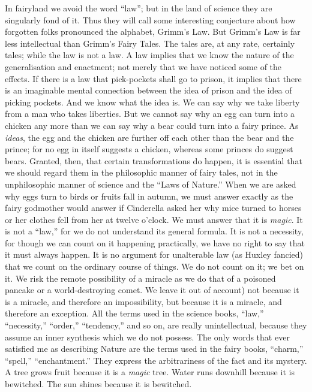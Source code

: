 \documentclass{book}
\begin{document}
In fairyland we avoid the word “law”; but in the land of science they are singularly fond of it. Thus they will call some interesting conjecture about how forgotten folks pronounced the alphabet, Grimm’s Law. But Grimm’s Law is far less intellectual than Grimm’s Fairy Tales. The tales are, at any rate, certainly tales; while the law is not a law. A law implies that we know the nature of the generalisation and enactment; not merely that we have noticed some of the effects. If there is a law that pick-pockets shall go to prison, it implies that there is an imaginable mental connection between the idea of prison and the idea of picking pockets. And we know what the idea is. We can say why we take liberty from a man who takes liberties. But we cannot say why an egg can turn into a chicken any more than we can say why a bear could turn into a fairy prince. As \emph{ideas}, the egg and the chicken are further off each other than the bear and the prince; for no egg in itself suggests a chicken, whereas some princes do suggest bears. Granted, then, that certain transformations do happen, it is essential that we should regard them in the philosophic manner of fairy tales, not in the unphilosophic manner of science and the “Laws of Nature.” When we are asked why eggs turn to birds or fruits fall in autumn, we must answer exactly as the fairy godmother would answer if Cinderella asked her why mice turned to horses or her clothes fell from her at twelve o’clock. We must answer that it is \emph{magic}. It is not a “law,” for we do not understand its general formula. It is not a necessity, for though we can count on it happening practically, we have no right to say that it must always happen. It is no argument for unalterable law (as Huxley fancied) that we count on the ordinary course of things. We do not count on it; we bet on it. We risk the remote possibility of a miracle as we do that of a poisoned pancake or a world-destroying comet. We leave it out of account) not because it is a miracle, and therefore an impossibility, but because it is a miracle, and therefore an exception. All the terms used in the science books, “law,” “necessity,” “order,” “tendency,” and so on, are really unintellectual, because they assume an inner synthesis which we do not possess. The only words that ever satisfied me as describing Nature are the terms used in the fairy books, “charm,” “spell,” “enchantment.” They express the arbitrariness of the fact and its mystery. A tree grows fruit because it is a \emph{magic} tree. Water runs downhill because it is bewitched. The sun shines because it is bewitched.
\end{document}
